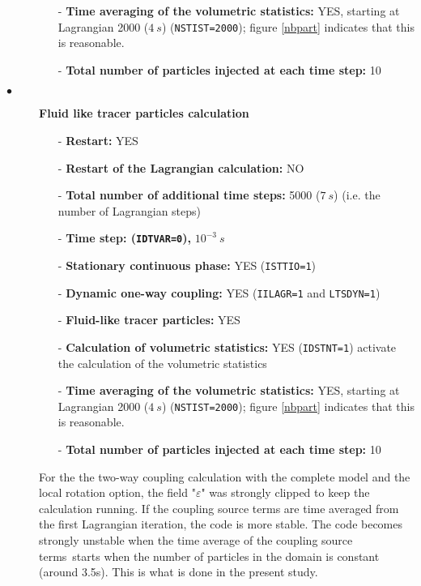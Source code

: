 \begin{description}
\begin{itemize}
            \item[-] {\bf Time averaging of the volumetric statistics:} YES, starting at Lagrangian 2000 ($4~s$) (\texttt{NSTIST=2000}); figure \ref{nbpart} indicates that this is reasonable.
            \item[-] {\bf Total number of particles injected at each time step:} 10
         \end{itemize}
         
   \item[$\bullet$]\textbf{Fluid like tracer particles calculation}
         \begin{itemize}
            \item[-] {\bf Restart:} YES
            \item[-] {\bf Restart of the Lagrangian calculation:} NO
            \item[-] {\bf Total number of additional time steps:} 5000 ($7~s$)
                  (i.e. the number of Lagrangian steps)
            \item[-] {\bf Time step: (\texttt{IDTVAR=0}),} $10^{-3}~s$
            \item[-] \textbf{Stationary continuous phase:} YES (\texttt{ISTTIO=1})
            \item[-] {\bf Dynamic one-way coupling:} YES (\texttt{IILAGR=1} and \texttt{LTSDYN=1})
            \item[-] {\bf Fluid-like tracer particles:} YES
            \item[-] {\bf Calculation of volumetric statistics:} YES
                  (\texttt{IDSTNT=1}) activate the calculation of the volumetric statistics
            \item[-] {\bf Time averaging of the volumetric statistics:} YES, starting at Lagrangian 2000 ($4~s$) (\texttt{NSTIST=2000}); figure \ref{nbpart} indicates that this is reasonable.
            \item[-] {\bf Total number of particles injected at each time step:} 10
         \end{itemize}

For the the two-way coupling calculation with the complete model and the local rotation option, the field "$\varepsilon$" was strongly clipped to keep the calculation running. If the coupling source terms are time averaged from the first Lagrangian iteration, the code is more stable. The code becomes strongly unstable when the time average of the coupling source terms starts when the number of particles in the domain is constant (around 3.5s). This is what is done in the present study.


\end{description}

